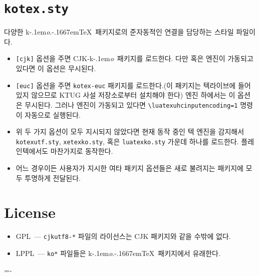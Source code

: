 \documentclass[dvipdfmx,b5paper]{article}
\def\koTeX{\textsf{k}\kern-.1em\textit{o}.\kern-.1667em\TeX}
\def\cjkko{\mbox{CJK-\textsf{k}\kern-.1em\textit{o}}}
\begin{document}
\section{\texttt{kotex.sty}}
다양한 \koTeX\ 패키지로의 준자동적인 연결을 담당하는 스타일 파일이다.
\begin{itemize}
  \item \verb|[cjk]| 옵션을 주면 \cjkko\ 패키지를 로드한다.
    다만  혹은  엔진이 가동되고 있다면
    이 옵션은 무시된다.
  \item \verb|[euc]| 옵션을 주면 \verb|kotex-euc| 패키지를 로드한다.(이
    패키지는 텍라이브에 들어있지 않으므로 KTUG 사설 저장소로부터
    설치해야 한다)  엔진 하에서는 이 옵션은 무시된다.
    그러나  엔진이 가동되고 있다면
    \verb|\luatexuhcinputencoding=1| 명령이 자동으로 실행된다.
  \item 위 두 가지 옵션이 모두 지시되지 않았다면 현재 동작 중인 텍 엔진을
    감지해서 \verb|kotexutf.sty|, \verb|xetexko.sty|, 혹은 \verb|luatexko.sty|
    가운데 하나를 로드한다.  플레인텍에서도 마찬가지로 동작한다.
  \item 어느 경우이든 사용자가 지시한 여타 패키지 옵션들은 새로 불려지는
    패키지에 모두 투명하게 전달된다.
\end{itemize}

\section{License}
\begin{itemize}
  \item GPL~--- \verb|cjkutf8-*| 파일의 라이선스는 CJK 패키지와
    같을 수밖에 없다.
  \item LPPL~--- \verb|ko*| 파일들은 \koTeX\ 패키지에서 유래한다.
\end{itemize}
\nobreak\hfill \fboxsep=-\fboxrule {}
\end{document}
